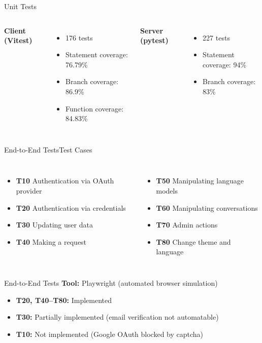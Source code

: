 \documentclass{sdqbeamer}[en]
\begin{document}
\begin{frame}{Unit Tests}
  \begin{columns}
    \textbf{Client (Vitest)}
    \begin{itemize}
      \item 176 tests
      \item Statement coverage: 76.79\%
      \item Branch coverage: 86.9\%
      \item Function coverage: 84.83\%
    \end{itemize}
    \textbf{Server (pytest)}
    \begin{itemize}
      \item 227 tests
      \item Statement coverage: 94\%
      \item Branch coverage: 83\%
    \end{itemize}
  \end{columns}
\end{frame}

\begin{frame}{End-to-End Tests}{Test Cases}
  \begin{columns}[T]
    \begin{itemize}
      \item \textbf{T10} Authentication via OAuth provider
      \item \textbf{T20} Authentication via credentials
      \item \textbf{T30} Updating user data
      \item \textbf{T40} Making a request
    \end{itemize}
    \begin{itemize}
      \item \textbf{T50} Manipulating language models
      \item \textbf{T60} Manipulating conversations
      \item \textbf{T70} Admin actions
      \item \textbf{T80} Change theme and language
    \end{itemize}
  \end{columns}
\end{frame}

\begin{frame}{End-to-End Tests}
  \textbf{Tool:} Playwright (automated browser simulation)
  \vspace{0.5em}
  \begin{itemize}
    \item \textbf{T20, T40--T80:} Implemented
    \item \textbf{T30:} Partially implemented (email verification not automatable)
    \item \textbf{T10:} Not implemented (Google OAuth blocked by captcha)
  \end{itemize}
\end{frame}
\end{document}
